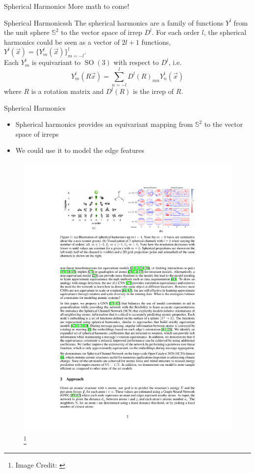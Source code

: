 \documentclass[pdf,serif]{beamer}
\begin{document}
\begin{frame}{Spherical Harmonics}
    More math to come!
    \begin{defi}{Spherical Harmonics}{sh}
        The spherical harmonics are a family of functions $Y^l$ from the unit sphere $\mathbb S^2$ to the vector space of irrep $D^l$. For each order $l$, the spherical harmonics could be seen as a vector of
        $2l+1$ functions, $Y^l(\vec{x})=\{Y^l_m(\vec{x})\}_{m=-l}^l$. \\

        Each $Y^l_m$ is equivariant to $\operatorname{SO}(3)$ with respect to $D^l$, i.e.
        \[Y^l_m(R\vec{x})=\sum_{n=-l}^l D^l(R)_{mn} Y^l_n(\vec{x})\]
        where $R$ is a rotation matrix and $D^l(R)$ is the irrep of $R$.

    \end{defi}
\end{frame}

\begin{frame}{Spherical Harmonics}
    \begin{itemize}
        \item Spherical harmonics provides an equivariant mapping from $\mathbb S^2$ to the vector space of irreps
        \item We could use it to model the edge features
    \end{itemize}
    \begin{figure}
        \includegraphics[width=0.7\linewidth]{images/sh.pdf}\footnote[frame]{Image Credit: \citet{zitnick2022spherical}}
    \end{figure}
\end{frame}
\end{document}
